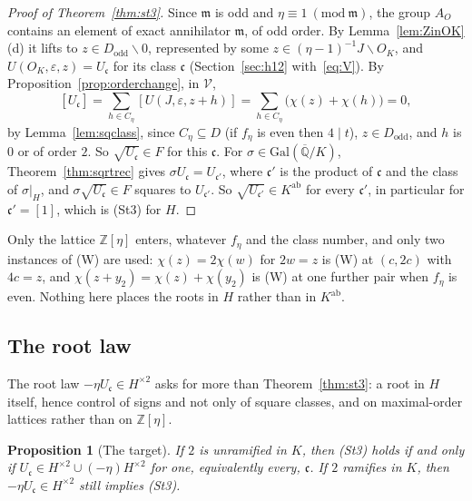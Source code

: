 \documentclass[11pt]{amsart}
\numberwithin{equation}{section}
\theoremstyle{plain}
\newtheorem{proposition}[theorem]{Proposition}
\theoremstyle{definition}
\theoremstyle{remark}
\begin{document}
\begin{proof}[Proof of Theorem~\ref{thm:st3}]
Since \(\mathfrak m\) is odd and \(\eta\equiv1\ (\mathrm{mod}\ \mathfrak m)\), the group \(A_O\) contains an element of exact annihilator \(\mathfrak m\), of odd order. By Lemma~\ref{lem:ZinOK}(d) it lifts to \(z\in D_{\mathrm{odd}}\smallsetminus0\), represented by some \(z\in(\eta-1)^{-1}J\smallsetminus O_K\), and \(U(O_K,\varepsilon,z)=U_{\mathfrak c}\) for its class \(\mathfrak c\) (Section~\ref{sec:h12} with~\eqref{eq:V}). By Proposition~\ref{prop:orderchange}, in \(\mathcal V\),
\[[U_{\mathfrak c}]=\sum_{h\in C_\eta}[U(J,\varepsilon,z+h)]=\sum_{h\in C_\eta}\bigl(\chi(z)+\chi(h)\bigr)=0,\]
by Lemma~\ref{lem:sqclass}, since \(C_\eta\subseteq D\) (if \(f_\eta\) is even then \(4\mid t\)), \(z\in D_{\mathrm{odd}}\), and \(h\) is \(0\) or of order \(2\). So \(\sqrt{U_{\mathfrak c}}\in F\) for this \(\mathfrak c\). For \(\sigma\in\mathrm{Gal}(\overline{\mathbb Q}/K)\), Theorem~\ref{thm:sqrtrec} gives \(\sigma U_{\mathfrak c}=U_{\mathfrak c'}\), where \(\mathfrak c'\) is the product of \(\mathfrak c\) and the class of \(\sigma|_H\), and \(\sigma\sqrt{U_{\mathfrak c}}\in F\) squares to \(U_{\mathfrak c'}\). So \(\sqrt{U_{\mathfrak c'}}\in K^{\mathrm{ab}}\) for every \(\mathfrak c'\), in particular for \(\mathfrak c'=[1]\), which is (St3) for \(H\).
\end{proof}

Only the lattice \(\mathbb Z[\eta]\) enters, whatever \(f_\eta\) and the class number, and only two instances of (W) are used: \(\chi(z)=2\chi(w)\) for \(2w=z\) is (W) at \((c,2c)\) with \(4c=z\), and \(\chi(z+y_2)=\chi(z)+\chi(y_2)\) is (W) at one further pair when \(f_\eta\) is even. Nothing here places the roots in \(H\) rather than in \(K^{\mathrm{ab}}\).

\subsection{The root law}\label{sec:rootlaw}

The root law \(-\eta U_{\mathfrak c}\in H^{\times2}\) asks for more than Theorem~\ref{thm:st3}: a root in \(H\) itself, hence control of signs and not only of square classes, and on maximal-order lattices rather than on \(\mathbb Z[\eta]\).

\begin{proposition}[The target]\label{prop:target}
If \(2\) is unramified in \(K\), then (St3) holds if and only if \(U_{\mathfrak c}\in H^{\times2}\cup(-\eta)H^{\times2}\) for one, equivalently every, \(\mathfrak c\). If \(2\) ramifies in \(K\), then \(-\eta U_{\mathfrak c}\in H^{\times2}\) still implies (St3).
\end{proposition}
\end{document}
